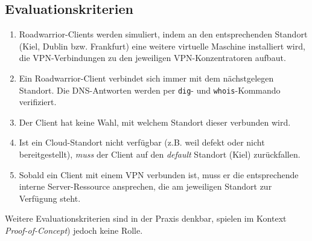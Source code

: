 \subsection{Evaluationskriterien}\label{eval-roadwarrior}
\begin{enumerate}
\item \gls{Roadwarrior}-\gls{Client}s werden simuliert, indem an den entsprechenden Standort (Kiel, Dublin bzw. Frankfurt) eine weitere virtuelle Maschine installiert wird, die \gls{VPN}-Verbindungen zu den jeweiligen \gls{VPN-Konzentrator}en aufbaut.
\item Ein \gls{Roadwarrior}-\gls{Client} verbindet sich immer mit dem nächstgelegen Standort. Die \gls{DNS}-Antworten werden per \texttt{dig}- und \texttt{whois}-Kommando verifiziert.
\item Der \gls{Client} hat keine Wahl, mit welchem Standort dieser verbunden wird.
\item Ist ein Cloud-Standort nicht verfügbar (z.B. weil defekt oder nicht bereitgestellt), \textit{muss} der \gls{Client} auf den \textit{default} Standort (Kiel) zurückfallen.
\item Sobald ein \gls{Client} mit einem \gls{VPN} verbunden ist, muss er die entsprechende interne Server-Ressource ansprechen, die am jeweiligen Standort zur Verfügung steht.
\end{enumerate}

Weitere Evaluationskriterien sind in der Praxis denkbar, spielen im Kontext \textit{Proof-of-Concept}) jedoch keine Rolle.
